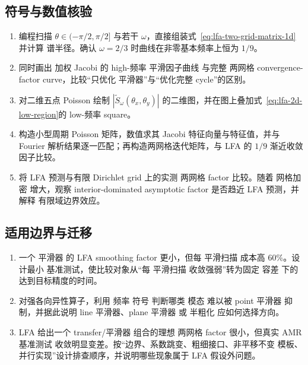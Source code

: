 \subsection*{符号与数值核验}
\begin{enumerate}[label=\arabic*.]
\item 编程扫描 $\theta\in(-\pi/2,\pi/2]$ 与若干 $\omega$，直接组装式~\eqref{eq:lfa-two-grid-matrix-1d}并计算 谱半径。确认 $\omega=2/3$ 时曲线在非零基本频率上恒为 $1/9$。

\item 同时画出 加权 Jacobi 的 high-频率 平滑因子曲线 与完整 两网格 convergence-factor curve，比较“只优化 平滑器”与“优化完整 cycle”的区别。

\item 对二维五点 Poisson 绘制 $|\widetilde S_\omega(\theta_x,\theta_y)|$ 的二维图，并在图上叠加式~\eqref{eq:lfa-2d-low-region}的 low-频率 square。

\item 构造小型周期 Poisson 矩阵，数值求其 Jacobi 特征向量与特征值，并与 Fourier 解析结果逐一匹配；再构造两网格迭代矩阵，与 LFA 的 $1/9$ 渐近收敛因子比较。

\item 将 LFA 预测与有限 Dirichlet grid 上的实测 两网格 factor 比较。随着 网格加密 增大，观察 interior-dominated asymptotic factor 是否趋近 LFA 预测，并解释 有限域边界效应。
\end{enumerate}

\subsection*{适用边界与迁移}
\begin{enumerate}[label=\arabic*.]
\item 一个 平滑器 的 LFA smoothing factor 更小，但每 平滑扫描 成本高 $60\%$。设计最小 基准测试，使比较对象从“每 平滑扫描 收敛强弱”转为固定 容差 下的 达到目标精度的时间。

\item 对强各向异性算子，利用 频率 符号 判断哪类 模态 难以被 point 平滑器 抑制，并据此说明 line 平滑器、plane 平滑器 或 半粗化 应如何选择方向。

\item LFA 给出一个 transfer/平滑器 组合的理想 两网格 factor 很小，但真实 AMR 基准测试 收敛明显变差。按“边界、系数跳变、粗细接口、非平移不变 模板、并行实现”设计排查顺序，并说明哪些现象属于 LFA 假设外问题。
\end{enumerate}
